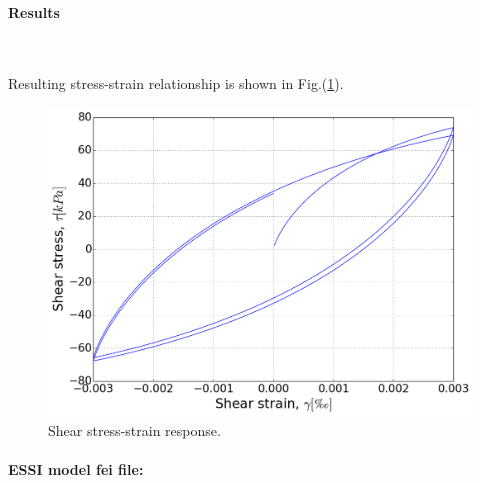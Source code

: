 \documentclass[fleqn,11pt]{article}
\begin{document}
\paragraph{Results} ~

Resulting stress-strain relationship is shown in Fig.(\ref{fig_ShearBeam_result}). 

\begin{figure}[!htb]
  \centering
  \includegraphics[width=12cm]{../Figure-files/_Chapter_Appendix_Illustrative_Examples/pisanoLT_test01.png}
  \caption{Shear stress-strain response.}
  \label{fig_ShearBeam_result}
\end{figure}

\paragraph{ESSI model fei file: } ~
\end{document}
